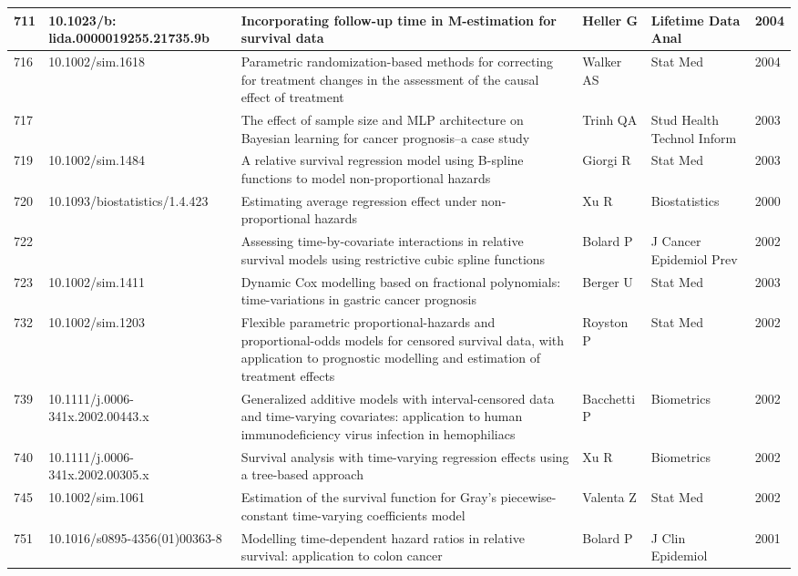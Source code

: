 \begin{landscape}
\begin{longtable}{|p{0.3in}|p{1.8in}|p{2.4in}|p{0.68in}|p{0.89in}|p{0.3in}|}
711 & 10.1023/b:    lida.0000019255.\-21735.9b & Incorporating follow-up time in M-estimation for survival data & Heller G & Lifetime Data Anal & 2004 \\ \hline 
716 & 10.1002/sim.1618     & Parametric randomization-based methods for correcting for treatment changes in the assessment of the causal effect of treatment & Walker AS & Stat Med & 2004 \\ \hline 
717 &  & The effect of sample size and MLP architecture on Bayesian learning for cancer prognosis--a case study & Trinh QA & Stud Health Technol Inform & 2003 \\ \hline 
719 & 10.1002/sim.1484     & A relative survival regression model using B-spline functions to model non-proportional hazards & Giorgi R & Stat Med & 2003 \\ \hline 
720 & 10.1093/biostatistics/1.4.423   & Estimating average regression effect under non-proportional hazards & Xu R & Biostatistics & 2000 \\ \hline 
722 &  & Assessing time-by-covariate interactions in relative survival models using restrictive cubic spline functions & Bolard P & J Cancer Epidemiol Prev & 2002 \\ \hline 
723 & 10.1002/sim.1411    & Dynamic Cox modelling based on fractional polynomials: time-variations in gastric cancer prognosis & Berger U & Stat Med & 2003 \\ \hline 
732 & 10.1002/sim.1203    & Flexible parametric proportional-hazards and proportional-odds models for censored survival data, with application to prognostic modelling and estimation of treatment effects & Royston P & Stat Med & 2002 \\ \hline 
739 & 10.1111/j.0006-341x.2002.00443.x    & Generalized additive models with interval-censored data and time-varying covariates: application to human immunodeficiency virus infection in hemophiliacs & Bacchetti P & Biometrics & 2002 \\ \hline 
740 & 10.1111/j.0006-341x.2002.00305.x   & Survival analysis with time-varying regression effects using a tree-based approach & Xu R & Biometrics & 2002 \\ \hline 
745 & 10.1002/sim.1061   & Estimation of the survival function for Gray's piecewise-constant time-varying coefficients model & Valenta Z & Stat Med & 2002 \\ \hline 
751 & 10.1016/s0895-4356(01)00363-8   & Modelling time-dependent hazard ratios in relative survival: application to colon cancer & Bolard P & J Clin Epidemiol & 2001 \\ \hline 

\end{longtable}
\end{landscape}
